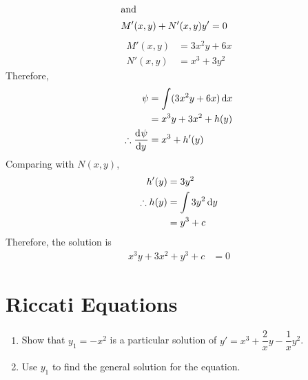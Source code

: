 \documentclass[fleqn, a4paper, 12pt, oneside]{amsart}
\theoremstyle{definition}
\theoremstyle{theorem}
\begin{document}
\begin{solution}
\begin{enumerate}[leftmargin=*]
\begin{align*}
				\intertext{and}
				M'(x,y) + N'(x,y) y' &= 0
			\end{align*}
			\begin{align*}
				M'(x,y) &= 3 x^2 y + 6 x\\
				N'(x,y) &= x^3 + 3 y^2
			\end{align*}
			Therefore,
			\begin{align*}
				\psi &= \int (3 x^2 y + 6 x) \dif x\\
				&= x^3 y + 3 x^2 + h(y)\\
				\therefore \dod{\psi}{y} &= x^3 + h'(y)
			\end{align*}
			Comparing with $N(x,y)$,
			\begin{align*}
				h'(y) &= 3 y^2\\
				\therefore h(y) &= \int 3 y^2 \dif y\\
				&= y^3 + c
			\end{align*}
			Therefore, the solution is
			\begin{align*}
				x^3 y + 3 x^2 + y^3 + c &= 0
			\end{align*}
	\end{enumerate}
\end{solution}

\part{Riccati Equations}

\begin{question}
	\begin{enumerate}[leftmargin=*]
		\item Show that $y_1 = -x^2$ is a particular solution of $y' = x^3 + \dfrac{2}{x} y - \dfrac{1}{x} y^2$.
		\item Use $y_1$ to find the general solution for the equation.
	\end{enumerate}
\end{question}
\end{document}
